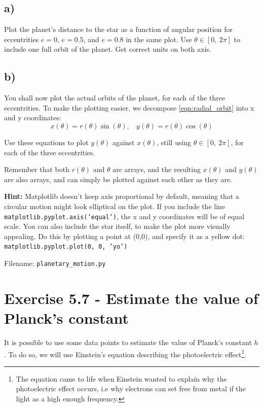 \documentclass[10pt,a4paper]{article}
\begin{document}
\subsection*{a)}
Plot the planet's distance to the star as a function of angular position for eccentrities $e = 0$, $e = 0.5$, and $e = 0.8$ in the same plot. Use $\theta \in [0,\ 2\pi]$ to include one full orbit of the planet. Get correct units on both axis.


\subsection*{b)}
You shall now plot the actual orbits of the planet, for each of the three eccentrities. To make the plotting easier, we decompose \ref{eqn:radial_orbit} into x and y coordinates:
\[	x(\theta) = r(\theta)\sin(\theta),\ \ \ \ y(\theta) = r(\theta)\cos(\theta)
\]

Use these equations to plot $y(\theta)$ against $x(\theta)$, still using $\theta \in [0,\ 2\pi]$, for each of the three eccentrities.

Remember that both $r(\theta)$ and $\theta$ are arrays, and the resulting $x(\theta)$ and $y(\theta)$ are also arrays, and can simply be plotted against each other as they are.

\textbf{Hint:} Matplotlib doesn't keep axis proportional by default, meaning that a circular motion might look elliptical on the plot. If you include the line \texttt{matplotlib.pyplot.axis('equal')}, the x and y coordinates will be of equal scale.
You can also include the star itself, to make the plot more visually appealing. Do this by plotting a point at (0,0), and specify it as a yellow dot: \texttt{matplotlib.pyplot.plot(0, 0, 'yo')}

Filename: \texttt{planetary\_motion.py}



\section*{Exercise 5.7 - Estimate the value of Planck's constant}

It is possible to use some data points to estimate the value of Planck's constant $h$. To do so, we will use Einstein's equation describing the photoelectric effect\footnote{The equation came to life when Einstein wanted to explain why the photoelectric effect occurs, i.e why electrons can set free from metal if the light as a high enough frequency.}. 
\end{document}
